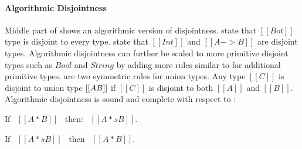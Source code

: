 \paragraph{Algorithmic Disjointness}
Middle part of  shows an algorithmic version of disjointness.
 state that $[[Bot]]$ type is disjoint to every type.
 state that $[[Int]]$ and $[[A -> B]]$ are disjoint types.
Algorithmic disjointness can further be scaled to more primitive disjoint types such as
$Bool$ and $String$ by adding more rules similar to  for additional primitive types.
 are two symmetric rules for union types. Any type $[[C]]$ is disjoint
to union type $[[A \/ B]]$ if $[[C]]$ is disjoint to both $[[A]]$ and $[[B]]$.
Algorithmic disjointness is sound and complete with respect to :

\begin{lemma}
  If \ $[[A * B]]$ \ then: \ $[[A *s B]]$.
\label{lemma:union:disj-sound}
\end{lemma}

\begin{comment}
\begin{proof}
  By induction on algorithmic disjointness relation.
  \begin{itemize}
    \item Cases \rref{ad-btmr, ad-btml, ad-orl, ad-orr} require induction on hypothesis
          and \Cref{lemma:union:sub-or}.
    \item Cases \rref{ad-intl, ad-intr} require induction on type and \Cref{lemma:union:sub-or}.
  \end{itemize}
\end{proof}
\end{comment}

\begin{lemma}
  If \ $[[A *s B]]$ \ then \ $[[A * B]]$.
\label{lemma:union:disj-complete}
\end{lemma}

